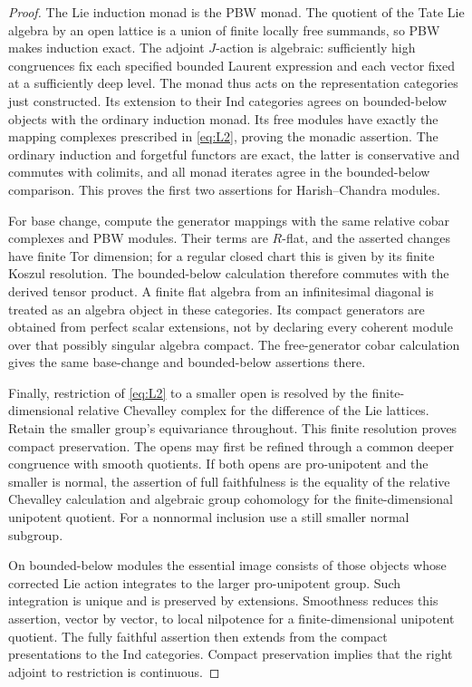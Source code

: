 \begin{proof}
The Lie induction monad is the PBW monad.  The quotient of the Tate
Lie algebra by an open lattice is a union of finite locally free
summands, so PBW makes induction exact.  The adjoint $J$-action is
algebraic: sufficiently high congruences fix each specified bounded
Laurent expression and each vector fixed at a sufficiently deep
level.  The monad thus acts on the representation categories just
constructed.  Its extension to their Ind categories agrees on
bounded-below objects with the ordinary induction monad.  Its free
modules have exactly the mapping complexes prescribed in
\eqref{eq:L2}, proving the monadic assertion.  The ordinary induction
and forgetful functors are exact, the latter is conservative and
commutes with colimits, and all monad iterates agree in the
bounded-below comparison.  This proves the first two assertions for
Harish--Chandra modules.

For base change, compute the generator mappings with the same relative
cobar complexes and PBW modules.  Their terms are $R$-flat, and the
asserted changes have finite Tor dimension; for a regular closed
chart this is given by its finite Koszul resolution.
The bounded-below calculation therefore commutes with the derived
tensor product.  A finite flat algebra from an infinitesimal diagonal
is treated as an algebra object in these categories.  Its compact
generators are obtained from perfect scalar extensions, not by
declaring every coherent module over that possibly singular algebra
compact.  The free-generator cobar calculation gives the same
base-change and bounded-below assertions there.

Finally, restriction of \eqref{eq:L2} to a smaller open is resolved
by the finite-dimensional relative Chevalley complex for the
difference of the Lie lattices.  Retain the smaller group's
equivariance throughout.  This finite resolution proves compact
preservation.  The opens may first be refined through a common
deeper congruence with smooth quotients.  If both opens are
pro-unipotent and the smaller is normal, the assertion of full
faithfulness is the equality of the relative Chevalley calculation
and algebraic group cohomology for the finite-dimensional unipotent
quotient.  For a nonnormal inclusion use a still smaller normal
subgroup.

On bounded-below modules the essential image consists of those
objects whose corrected Lie action integrates to the larger
pro-unipotent group.  Such integration is unique and is preserved by
extensions.  Smoothness reduces this assertion, vector by vector,
to local nilpotence for a finite-dimensional unipotent quotient.
The fully faithful assertion then extends from the compact
presentations to the Ind categories.  Compact preservation implies
that the right adjoint to restriction is continuous.
\end{proof}

